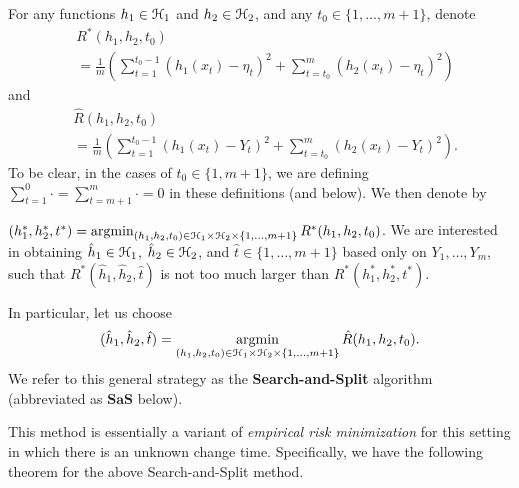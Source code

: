 \documentclass{article}
\newcommand{\eat}[1]{}
\begin{document}
For any functions $h_{1} \in \mathcal H_{1}$ and $h_{2} \in \mathcal H_{2}$, 
and any $t_{0} \in \{1,\ldots,m+1\}$, denote
\begin{equation*}
\begin{split}
&R^{*}(h_{1},h_{2},t_{0})\\& = \frac{1}{m} \left( \sum_{t=1}^{t_{0}-1} ( h_{1}(x_{t}) - \eta_{t} )^{2} + \sum_{t=t_{0}}^{m} ( h_{2}(x_{t}) - \eta_{t} )^{2} \right)
\end{split}
\end{equation*}
and 
\begin{equation*}
\begin{split}
&\hat{R}(h_{1},h_{2},t_{0})\\& = \frac{1}{m} \left( \sum_{t=1}^{t_{0}-1} ( h_{1}(x_{t}) - Y_{t} )^{2} + \sum_{t=t_{0}}^{m} ( h_{2}(x_{t}) - Y_{t} )^{2} \right).
\end{split}
\end{equation*}
%
To be clear, in the cases of $t_{0} \in \{1,m+1\}$, we are defining $\sum_{t=1}^{0} \cdot = \sum_{t=m+1}^{m} \cdot = 0$ in these definitions (and below).
We then denote by 

$(h_{1}^{*},h_{2}^{*},t^{*}) = \mathop{\rm argmin}_{(h_{1},h_{2},t_{0}) \in \mathcal H_{1} \times \mathcal H_{2} \times \{1,\ldots,m+1\}} R^{*}(h_{1},h_{2},t_{0})$.
We are interested in obtaining $\hat{h}_{1} \in \mathcal H_{1}$, $\hat{h}_{2} \in \mathcal H_{2}$, and $\hat{t} \in \{1,\ldots,m+1\}$ based only on $Y_{1},\ldots,Y_{m}$,
such that $R^{*}(\hat{h}_{1},\hat{h}_{2},\hat{t})$ is not too much larger than $R^{*}(h_{1}^{*},h_{2}^{*},t^{*})$.

\begin{bigboxit}
In particular, let us choose
\begin{equation*}
(\hat{h}_{1},\hat{h}_{2},\hat{t}) = \mathop{\rm argmin}_{(h_{1},h_{2},t_{0}) \in \mathcal H_{1} \times \mathcal H_{2} \times \{1,\ldots,m+1\}} \hat{R}(h_{1},h_{2},t_{0}).
\end{equation*}
We refer to this general strategy as the {\bf Search-and-Split} algorithm (abbreviated as $\mathbf{SaS}$ below).
\end{bigboxit}

This method is essentially a variant of \emph{empirical risk minimization} for this setting 
in which there is an unknown change time.\eat{  The supplementary material includes an extension 
of our theory to allow for regularized learning rules as well.  This introduces some technical
complications, but the core argument remains the same as in the simpler case presented here.}
Specifically, we have the following theorem for the above Search-and-Split method.
\end{document}
